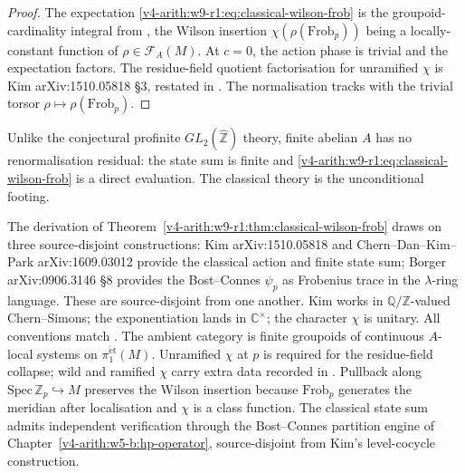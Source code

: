 \begin{proof}
The expectation \eqref{v4-arith:w9-r1:eq:classical-wilson-frob} is the
groupoid-cardinality integral from
, the Wilson insertion
\(\chi(\rho(\mathrm{Frob}_{p}))\) being a locally-constant function of
\(\rho\in\mathcal F_{A}(M)\). At \(c=0\), the action phase is trivial and
the expectation factors. The residue-field quotient factorisation for
unramified \(\chi\) is Kim arXiv:1510.05818 \S3, restated in
. The normalisation tracks
with the trivial torsor \(\rho\mapsto\rho(\mathrm{Frob}_{p})\).
\end{proof}

\begin{remark}
\label{v4-arith:w9-r1:rem:abelian-unconditional}
Unlike the conjectural profinite
\(GL_{2}(\widehat{\mathbb Z})\) theory, finite abelian \(A\) has no
renormalisation residual: the state sum
 is finite and
\eqref{v4-arith:w9-r1:eq:classical-wilson-frob} is a direct
evaluation. The classical theory is the unconditional footing.
\end{remark}

\begin{remark}
\label{v4-arith:w9-r1:rem:classical-sources}
The derivation of Theorem~\ref{v4-arith:w9-r1:thm:classical-wilson-frob}
draws on three source-disjoint constructions: Kim arXiv:1510.05818 and
Chern--Dan--Kim--Park arXiv:1609.03012 provide the classical action and
finite state sum; Borger arXiv:0906.3146 \S8 provides the
Bost--Connes \(\psi_{p}\) as Frobenius trace in the \(\lambda\)-ring language.
These are source-disjoint from one another.
Kim works in \(\mathbb Q/\mathbb Z\)-valued Chern--Simons; the
exponentiation lands in \(\mathbb C^{\times}\); the character \(\chi\)
is unitary. All conventions match .
The ambient category is finite groupoids of continuous \(A\)-local systems
on \(\pi_{1}^{\mathrm{\acute et}}(M)\).
Unramified \(\chi\) at \(p\) is required for the residue-field collapse;
wild and ramified \(\chi\) carry extra data recorded in
.
Pullback along \(\mathrm{Spec}\,\mathbb Z_{p}\hookrightarrow M\) preserves
the Wilson insertion because \(\mathrm{Frob}_{p}\) generates the meridian
after localisation and \(\chi\) is a class function.
The classical state sum admits independent verification through the
Bost--Connes partition engine of
Chapter~\ref{v4-arith:w5-b:hp-operator}, source-disjoint from Kim's
level-cocycle construction.
\end{remark}

